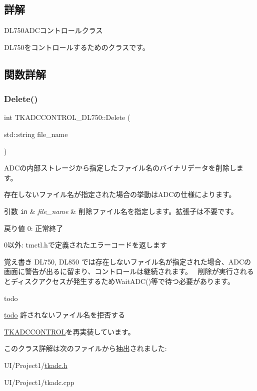 \subsection{詳解}
D\+L750\+A\+D\+Cコントロールクラス

D\+L750をコントロールするためのクラスです。 

\subsection{関数詳解}
\mbox{\label{class_t_k_a_d_c_c_o_n_t_r_o_l___d_l750_a27ce5b790800ffee6d2daddeb0bf9e17}} 
\subsubsection{\texorpdfstring{Delete()}{Delete()}}
{\footnotesize\ttfamily int T\+K\+A\+D\+C\+C\+O\+N\+T\+R\+O\+L\+\_\+\+D\+L750\+::\+Delete (\begin{DoxyParamCaption}\item[{std\+::string}]{file\+\_\+name }\end{DoxyParamCaption})\hspace{0.3cm}{\ttfamily [virtual]}}

A\+D\+Cの内部ストレージから指定したファイル名のバイナリデータを削除します。

存在しないファイル名が指定された場合の挙動は\+A\+D\+Cの仕様によります。 
\begin{DoxyParams}[1]{引数}
\mbox{\tt in}  & {\em file\+\_\+name} & 削除ファイル名を指定します。拡張子は不要です。 \\
\hline
\end{DoxyParams}
\begin{DoxyReturn}{戻り値}
0\+: 正常終了 

0以外\+: tmctl.\+hで定義されたエラーコードを返します 
\end{DoxyReturn}
\begin{DoxyNote}{覚え書き}
D\+L750, D\+L850 では存在しないファイル名が指定された場合、\+A\+D\+Cの画面に警告が出るに留まり、コントロールは継続されます。~\newline
 削除が実行されるとディスクアクセスが発生するため\+Wait\+A\+D\+C()等で待つ必要があります。 
\end{DoxyNote}
\begin{DoxyRefDesc}{todo}
\item[\hyperlink{todo__todo000002}{todo}]許されないファイル名を拒否する \end{DoxyRefDesc}


\hyperlink{class_t_k_a_d_c_c_o_n_t_r_o_l_afa385509f61162198950676d279f4c3c}{T\+K\+A\+D\+C\+C\+O\+N\+T\+R\+OL}を再実装しています。



このクラス詳解は次のファイルから抽出されました\+:\begin{DoxyCompactItemize}
\item 
U\+I/\+Project1/\hyperlink{tkadc_8h}{tkadc.\+h}\item 
U\+I/\+Project1/tkadc.\+cpp\end{DoxyCompactItemize}
